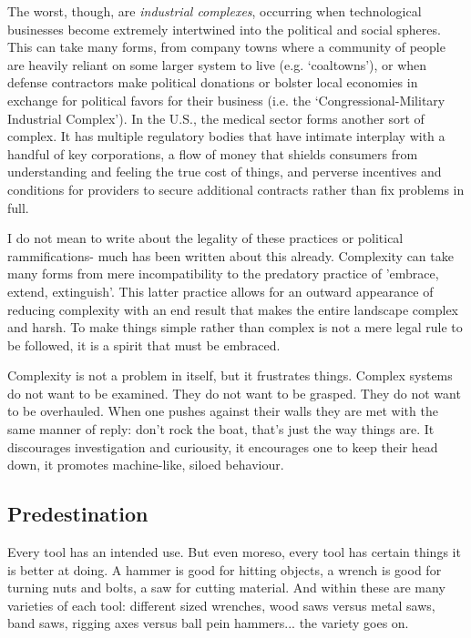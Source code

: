 \documentclass[letterpaper]{article}
\begin{document}
The worst, though, are \textit{industrial complexes}, occurring when technological businesses become extremely intertwined into the political and social spheres. This can take many forms, from company towns where a community of people are heavily reliant on some larger system to live (e.g. `coaltowns'), or when defense contractors make political donations or bolster local economies in exchange for political favors for their business (i.e. the `Congressional-Military Industrial Complex'). In the U.S., the medical sector forms another sort of complex. It has multiple regulatory bodies that have intimate interplay with a handful of key corporations, a flow of money that shields consumers from understanding and feeling the true cost of things, and perverse incentives and conditions for providers to secure additional contracts rather than fix problems in full.

I do not mean to write about the legality of these practices or political rammifications- much has been written about this already. Complexity can take many forms from mere incompatibility to the predatory practice of 'embrace, extend, extinguish'. This latter practice allows for an outward appearance of reducing complexity with an end result that makes the entire landscape complex and harsh. To make things simple rather than complex is not a mere legal rule to be followed, it is a spirit that must be embraced.

Complexity is not a problem in itself, but it frustrates things. Complex systems do not want to be examined. They do not want to be grasped. They do not want to be overhauled. When one pushes against their walls they are met with the same manner of reply: don't rock the boat, that's just the way things are. It discourages investigation and curiousity, it encourages one to keep their head down, it promotes machine-like, siloed behaviour.

\subsection{Predestination}

Every tool has an intended use. But even moreso, every tool has certain things it is better at doing. A hammer is good for hitting objects, a wrench is good for turning nuts and bolts, a saw for cutting material. And within these are many varieties of each tool: different sized wrenches, wood saws versus metal saws, band saws, rigging axes versus ball pein hammers... the variety goes on.
\end{document}

